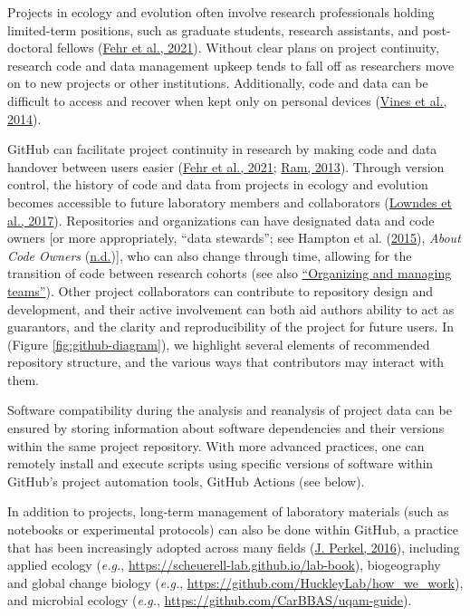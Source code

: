 Projects in ecology and evolution often involve research professionals holding limited-term positions, such as graduate students, research assistants, and post-doctoral fellows (\protect\hyperlink{ref-D4C4k4ak}{Fehr et al., 2021}).
Without clear plans on project continuity, research code and data management upkeep tends to fall off as researchers move on to new projects or other institutions.
Additionally, code and data can be difficult to access and recover when kept only on personal devices (\protect\hyperlink{ref-19kmNxiHc}{Vines et al., 2014}).

GitHub can facilitate project continuity in research by making code and data handover between users easier (\protect\hyperlink{ref-D4C4k4ak}{Fehr et al., 2021}; \protect\hyperlink{ref-4ny1onB0}{Ram, 2013}).
Through version control, the history of code and data from projects in ecology and evolution becomes accessible to future laboratory members and collaborators (\protect\hyperlink{ref-3DKwn1sY}{Lowndes et al., 2017}).
Repositories and organizations can have designated data and code owners {[}or more appropriately, ``data stewards''; see Hampton et al. (\protect\hyperlink{ref-iIEKCTLU}{2015}), \emph{About Code Owners} (\protect\hyperlink{ref-s91uGRZ2}{n.d.}){]}, who can also change through time, allowing for the transition of code between research cohorts (see also \protect\hyperlink{organizations}{``Organizing and managing teams''}).
Other project collaborators can contribute to repository design and development, and their active involvement can both aid authors ability to act as guarantors, and the clarity and reproducibility of the project for future users.
In (Figure \ref{fig:github-diagram}), we highlight several elements of recommended repository structure, and the various ways that contributors may interact with them.

Software compatibility during the analysis and reanalysis of project data can be ensured by storing information about software dependencies and their versions within the same project repository.
With more advanced practices, one can remotely install and execute scripts using specific versions of software within GitHub's project automation tools, GitHub Actions (see below).

In addition to projects, long-term management of laboratory materials (such as notebooks or experimental protocols) can also be done within GitHub, a practice that has been increasingly adopted across many fields (\protect\hyperlink{ref-10ghgV3S8}{J. Perkel, 2016}), including applied ecology (\emph{e.g.}, \url{https://scheuerell-lab.github.io/lab-book}), biogeography and global change biology (\emph{e.g.}, \url{https://github.com/HuckleyLab/how_we_work}), and microbial ecology (\emph{e.g.}, \url{https://github.com/CarBBAS/uqam-guide}).

